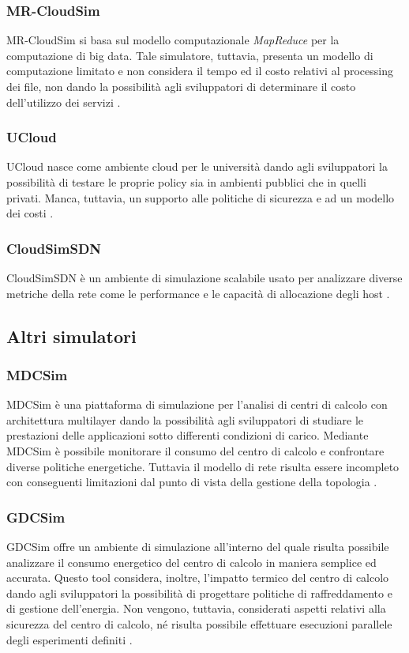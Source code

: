 {\subsubsection*{MR-CloudSim}
MR-CloudSim \cite{jung2012mr} si basa sul modello computazionale \emph{MapReduce} \cite{dean2008mapreduce} per la computazione di big data. Tale simulatore, tuttavia, presenta un modello di computazione limitato e non considera il tempo ed il costo relativi al processing dei file, non dando la possibilità agli sviluppatori di determinare il costo dell'utilizzo dei servizi \cite{mansouri2020cloud}. 
\subsubsection*{UCloud}
UCloud \cite{sqalli2012ucloud} nasce come ambiente cloud per le università dando agli sviluppatori la possibilità di testare le proprie policy sia in ambienti pubblici che in quelli privati. Manca, tuttavia, un supporto alle politiche di sicurezza e ad un modello dei costi \cite{mansouri2020cloud}.
\subsubsection*{CloudSimSDN}
CloudSimSDN \cite{son2015cloudsimsdn} è un ambiente di simulazione scalabile usato per analizzare diverse metriche della rete come le performance e le capacità di allocazione degli host \cite{khalil2017cloud}. 
\subsection{Altri simulatori}
\subsubsection*{MDCSim}
MDCSim \cite{lim2009mdcsim} è una piattaforma di simulazione per l'analisi di centri di calcolo con architettura multilayer dando la possibilità agli sviluppatori di studiare le prestazioni delle applicazioni sotto differenti condizioni di carico. Mediante MDCSim è possibile monitorare il consumo del centro di calcolo e confrontare diverse politiche energetiche. Tuttavia il modello di rete risulta essere incompleto con conseguenti limitazioni dal punto di vista della gestione della topologia \cite{mansouri2020cloud}. 
\subsubsection*{GDCSim}
GDCSim \cite{gupta2011gdcsim} offre un ambiente di simulazione all'interno del quale risulta possibile analizzare il consumo energetico del centro di calcolo in maniera semplice ed accurata. Questo tool considera, inoltre, l'impatto termico del centro di calcolo dando agli sviluppatori la possibilità di progettare politiche di raffreddamento e di gestione dell'energia. Non vengono, tuttavia, considerati aspetti relativi alla sicurezza del centro di calcolo, né risulta possibile effettuare esecuzioni parallele degli esperimenti definiti \cite{mansouri2020cloud}. 
}
